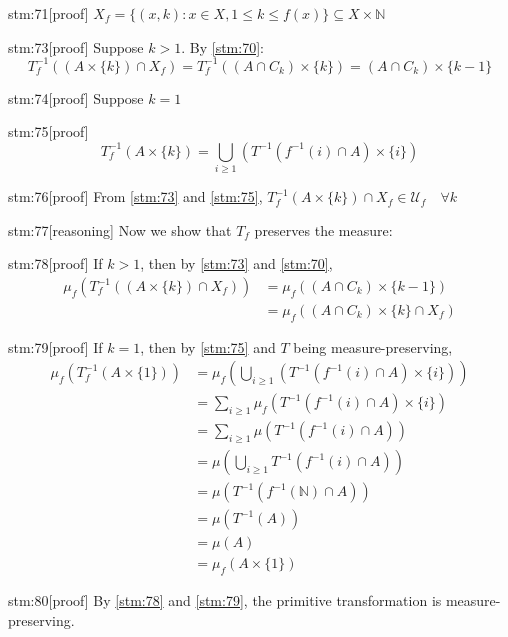 \begin{stm}{stm:71}[proof]
$X_f = \{(x,k) : x \in X, 1 \le k \le f(x)\} \subseteq X \times \mathbb{N}$
\end{stm}

\begin{stm}{stm:73}[proof]
Suppose $k > 1$. By \ref{stm:70}:
\[
T_f^{-1}((A \times \{k\}) \cap X_f) = T_f^{-1}((A \cap C_k) \times \{k\}) = (A \cap C_k) \times \{k-1\}
\]
\end{stm}

\begin{stm}{stm:74}[proof]
Suppose $k = 1$
\end{stm}

\begin{stm}{stm:75}[proof]
\[
T_f^{-1}(A \times \{k\}) = \bigcup_{i \ge 1} (T^{-1}(f^{-1}(i) \cap A) \times \{i\})
\]
\end{stm}

\begin{stm}{stm:76}[proof]
From \ref{stm:73} and \ref{stm:75}, $T_f^{-1}(A \times \{k\}) \cap X_f \in \mathcal{U}_f \quad \forall k$
\end{stm}

\begin{stm}{stm:77}[reasoning]
Now we show that $T_f$ preserves the measure:
\end{stm}

\begin{stm}{stm:78}[proof]
If $k > 1$, then by \ref{stm:73} and \ref{stm:70},
\begin{align*}
\mu_f(T_f^{-1}((A \times \{k\}) \cap X_f)) &= \mu_f((A \cap C_k) \times \{k-1\}) \\
&= \mu_f((A \cap C_k) \times \{k\} \cap X_f)
\end{align*}
\end{stm}

\begin{stm}{stm:79}[proof]
If $k = 1$, then by \ref{stm:75} and $T$ being measure-preserving,
\begin{align*}
\mu_f(T_f^{-1}(A \times \{1\})) &= \mu_f\left(\bigcup_{i \ge 1} (T^{-1}(f^{-1}(i) \cap A) \times \{i\})\right) \\
&= \sum_{i \ge 1} \mu_f(T^{-1}(f^{-1}(i) \cap A) \times \{i\}) \\
&= \sum_{i \ge 1} \mu(T^{-1}(f^{-1}(i) \cap A)) \\
&= \mu\left(\bigcup_{i \ge 1} T^{-1}(f^{-1}(i) \cap A)\right) \\
&= \mu(T^{-1}(f^{-1}(\mathbb{N}) \cap A)) \\
&= \mu(T^{-1}(A)) \\
&= \mu(A) \\
&= \mu_f(A \times \{1\})
\end{align*}
\end{stm}


\begin{stm}{stm:80}[proof]
By \ref{stm:78} and \ref{stm:79}, the primitive transformation is measure-preserving.
\end{stm}